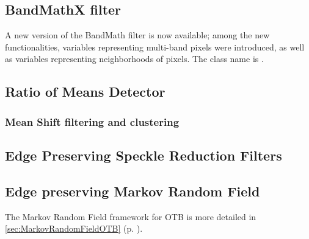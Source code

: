 \ifitkFullVersion

\fi

\subsection{BandMathX filter}
\label{sec:BandMathImageFilterX}
A new version of the BandMath filter is now available; among the new functionalities, variables representing multi-band pixels were introduced, as well as variables representing neighborhoods of pixels. The class name is .

\ifitkFullVersion

\fi


\subsection{Ratio of Means Detector}



\subsubsection{Mean Shift filtering and clustering}
\label{sec:MeanShift}

\ifitkFullVersion

\fi



\subsection{Edge Preserving Speckle Reduction Filters}
\label{sec:SpeckleFilters}
\ifitkFullVersion


\fi



\subsection{Edge preserving Markov Random Field}

The Markov Random Field framework for OTB is more detailed in \ref{sec:MarkovRandomFieldOTB} (p. \pageref{sec:MarkovRandomFieldOTB}).

\ifitkFullVersion

\fi






